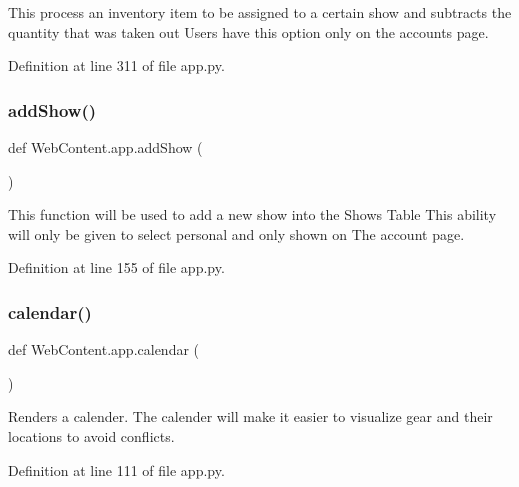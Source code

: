 \begin{DoxyVerb}This process an inventory item to be assigned to a certain show 
and subtracts the quantity that was taken out 
Users have this option only on the accounts page. 
\end{DoxyVerb}
 

Definition at line 311 of file app.\+py.

\mbox{\label{namespace_web_content_1_1app_ada0f5f23829cfced6b4d13fbf597f82b}} 
\subsubsection{\texorpdfstring{add\+Show()}{addShow()}}
{\footnotesize\ttfamily def Web\+Content.\+app.\+add\+Show (\begin{DoxyParamCaption}{ }\end{DoxyParamCaption})}

\begin{DoxyVerb}This function will be used to add a new show into the Shows Table
This ability will only be given to select personal and only shown on 
The account page. 
\end{DoxyVerb}
 

Definition at line 155 of file app.\+py.

\mbox{\label{namespace_web_content_1_1app_a368b9d1da5b4c987484797ecce9aabc9}} 
\subsubsection{\texorpdfstring{calendar()}{calendar()}}
{\footnotesize\ttfamily def Web\+Content.\+app.\+calendar (\begin{DoxyParamCaption}{ }\end{DoxyParamCaption})}

\begin{DoxyVerb}Renders a calender.
The calender will make it easier to visualize
gear and their locations to avoid conflicts.
\end{DoxyVerb}
 

Definition at line 111 of file app.\+py.

